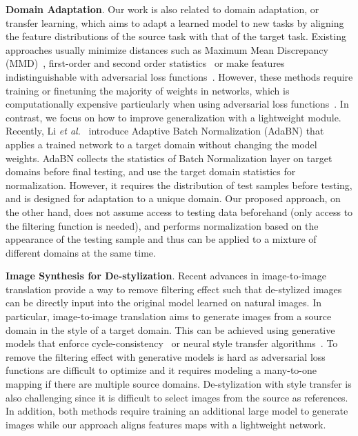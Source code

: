 \documentclass[letterpaper]{article} %
\begin{document}
\textbf{Domain Adaptation}. Our work is also related to domain adaptation, or transfer learning, which aims to adapt a learned model to new tasks by aligning the feature distributions of the source task with that of the target task. Existing approaches usually minimize distances such as Maximum Mean Discrepancy (MMD)~\cite{saito2018maximum}, first-order and second order statistics~\cite{DBLP:conf/eccv/SunS16} or make features indistinguishable with adversarial loss functions~\cite{ganin2016domain,DBLP:conf/cvpr/TzengHSD17}. However, these methods require training or finetuning the majority of weights in networks, which is computationally expensive particularly when using adversarial loss functions~\cite{arjovsky2017towards}. In contrast, we focus on how to improve generalization with a lightweight module. Recently, Li \textit{et al.}~\cite{li2016revisiting} introduce Adaptive Batch Normalization (AdaBN) that applies a trained network to a target domain without changing the model weights. AdaBN collects the statistics of Batch Normalization layer on target domains before final testing, and use the target domain statistics for normalization. However, it requires the distribution of test samples before testing, and is designed for adaptation to a unique domain. Our proposed approach, on the other hand, does not assume access to testing data beforehand (only access to the filtering function is needed), and performs normalization based on the appearance of the testing sample and thus can be applied to a mixture of different domains at the same time.

\textbf{Image Synthesis for De-stylization}. Recent advances in image-to-image translation provide a way to remove filtering effect such that de-stylized images can be directly input into the original model learned on natural images. In particular, image-to-image translation aims to generate images from a source domain in the style of a target domain. This can be achieved using generative models that enforce cycle-consistency~\cite{DBLP:conf/iccv/ZhuPIE17,huang2018munit} or neural style transfer algorithms~\cite{gatys2016image,huang2017adain}. To remove the filtering effect with generative models is hard as adversarial loss functions are difficult to optimize and it requires modeling a many-to-one mapping if there are multiple source domains. De-stylization with style transfer is also challenging since it is difficult to select  images from the source as references. In addition, both methods require training an additional large model to generate images while our approach aligns features maps with a lightweight network.
\end{document}
